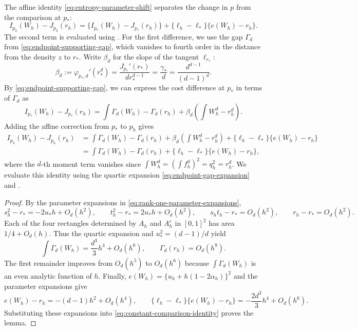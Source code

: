The affine identity \eqref{eq:entropy-parameter-shift} separates the change in $p$
from the comparison at $p_*$:
\[
  I_{p_h}(W_h)-J_{p_h}(r_h)
  =\{I_{p_*}(W_h)-J_{p_*}(r_h)\}
   +\{\ell_h-\ell_*\}\{e(W_h)-r_h\}.
\]
The second term is evaluated using .
For the first difference, we use the gap $\Gamma_d$ from
\eqref{eq:endpoint-supporting-gap}, which vanishes to fourth order in the
distance from the density $z$ to $r_*$.
Write $\beta_d$ for the slope of the tangent $\ell_{r_*}$:
\[
  \beta_d:=\varphi_{p_*,d}'(r_*^d)
  =\frac{J_{p_*}'(r_*)}{d r_*^{d-1}}
  =\frac{\gamma_*}{d}
  =\frac{d^{d-1}}{(d-1)^d}.
\]
By \eqref{eq:endpoint-supporting-gap}, we can express the cost difference
at $p_*$ in terms of $\Gamma_d$ as
\[
  I_{p_*}(W_h)-J_{p_*}(r_h)
  =\int\Gamma_d(W_h)-\Gamma_d(r_h)+\beta_d\left(\int W_h^d-r_h^d\right).
\]
Adding the affine correction from $p_*$ to $p_h$ gives
\begin{align}
  I_{p_h}(W_h)-J_{p_h}(r_h)
  &=\int\Gamma_d(W_h)-\Gamma_d(r_h)
  +\beta_d\left(\int W_h^d-r_h^d\right)
  +\{\ell_h-\ell_*\}\{e(W_h)-r_h\}
  \label{eq:constant-comparison-decomposition} \\
  &=\int\Gamma_d(W_h)-\Gamma_d(r_h)
   +\{\ell_h-\ell_*\}\{e(W_h)-r_h\},
   \label{eq:constant-comparison-identity}
\end{align}
where the $d$-th moment term vanishes since $\int W_h^d=(\int f_h^d)^2=q_h^2=r_h^d$.
We evaluate this identity using the quartic expansion
\eqref{eq:endpoint-gap-expansion} and .

\begin{proof}
By the parameter expansions in \eqref{eq:rank-one-parameter-expansions},
\[
  s_h^2-r_*=-2u_*h+O_d(h^2),
  \qquad
  t_h^2-r_*=2u_*h+O_d(h^2),
  \qquad
  s_ht_h-r_*=O_d(h^2),
  \qquad
  r_h-r_*=O_d(h^2).
\]
Each of the four rectangles determined by $A_h$ and $A_h^c$ in
$[0,1]^2$ has area $1/4+O_d(h)$.
Thus the quartic expansion and $u_*^2=(d-1)/d$ yield
\begin{equation}\label{eq:family-gap-expansion}
  \int\Gamma_d(W_h)=\frac{d^3}{3}h^4+O_d(h^6),
  \qquad
  \Gamma_d(r_h)=O_d(h^8).
\end{equation}
The first remainder improves from $O_d(h^5)$ to $O_d(h^6)$
because $\int\Gamma_d(W_h)$ is an even analytic function of $h$.
Finally, $e(W_h)=\{u_h+h(1-2\alpha_h)\}^2$ and the parameter expansions give
\[
  e(W_h)-r_h=-(d-1)h^2+O_d(h^4),
  \qquad
  \{\ell_h-\ell_*\}\{e(W_h)-r_h\}=-\frac{2d^3}{3}h^4+O_d(h^6).
\]
Substituting these expansions into \eqref{eq:constant-comparison-identity}
proves the lemma.
\end{proof}
